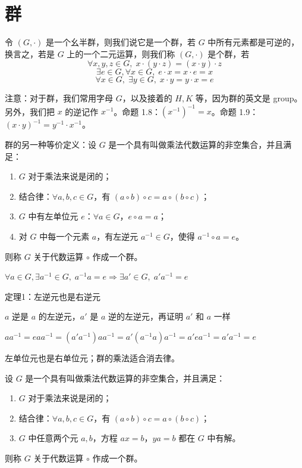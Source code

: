 \section{群}

\begin{definition}[群（定义 1.9）]
令 $(G,\cdot)$ 是一个幺半群，则我们说它是一个群，若 $G$ 中所有元素都是可逆的，换言之，若是 $G$ 上的一个二元运算，则我们称 $(G,\cdot)$ 是个群，若
\[
\forall x,y,z\in G,\;x\cdot(y\cdot z)=(x\cdot y)\cdot z
\]
\[
\exists e\in G,\forall x\in G,\;e\cdot x=x\cdot e=x
\]
\[
\forall x\in G,\;\exists y\in G,\;x\cdot y=y\cdot x=e
\]

注意：对于群，我们常用字母 $G$，以及接着的 $H,K$ 等，因为群的英文是 group。另外，我们把 $x$ 的逆记作 $x^{-1}$。命题 1.8：$(x^{-1})^{-1}=x$。命题 1.9：$(x\cdot y)^{-1}=y^{-1}\cdot x^{-1}$。
\end{definition}

\begin{note}
群的另一种等价定义：设 $G$ 是一个具有叫做乘法代数运算的非空集合，并且满足：
\begin{enumerate}
  \item[I.] $G$ 对于乘法来说是闭的；
  \item[II.] 结合律：$\forall a,b,c\in G$，有 $(a\circ b)\circ c=a\circ(b\circ c)$；
  \item[III.] $G$ 中有左单位元 $e$：$\forall a\in G$，$e\circ a=a$；
  \item[IV.] 对 $G$ 中每一个元素 $a$，有左逆元 $a^{-1}\in G$，使得 $a^{-1}\circ a=e$。
\end{enumerate}
则称 $G$ 关于代数运算 $\circ$ 作成一个群。
\end{note}

\begin{note}[群的性质]
$\forall a\in G,\exists a^{-1}\in G,\;a^{-1}a=e\Rightarrow\exists a'\in G,\;a'a^{-1}=e$

定理1：左逆元也是右逆元

$a$ 逆是 $a$ 的左逆元，$a'$ 是 $a$ 逆的左逆元，再证明 $a'$ 和 $a$ 一样

$aa^{-1}=eaa^{-1}=(a'a^{-1})aa^{-1}=a'(a^{-1}a)a^{-1}=a'ea^{-1}=a'a^{-1}=e$

左单位元也是右单位元；群的乘法适合消去律。
\end{note}

\begin{note}[群的等价判别]
设 $G$ 是一个具有叫做乘法代数运算的非空集合，并且满足：
\begin{enumerate}
  \item[I.] $G$ 对于乘法来说是闭的；
  \item[II.] 结合律：$\forall a,b,c\in G$，有 $(a\circ b)\circ c=a\circ(b\circ c)$；
  \item[III.] $G$ 中任意两个元 $a,b$，方程 $ax=b$，$ya=b$ 都在 $G$ 中有解。
\end{enumerate}
则称 $G$ 关于代数运算 $\circ$ 作成一个群。
\end{note}

